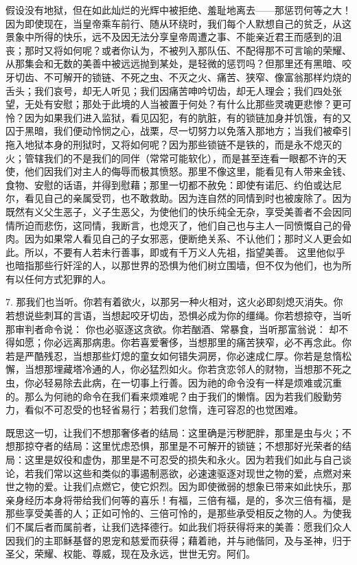 假设没有地狱，但在如此灿烂的光辉中被拒绝、羞耻地离去——那惩罚何等之大！因为即使现在，当皇帝乘车前行、随从环绕时，我们每个人默想自己的贫乏，从这景象中所得的快乐，远不及因无法分享皇帝周遭之事、不能亲近君王而感到的沮丧；那时又将如何呢？或者你认为，不被列入那队伍、不配得那不可言喻的荣耀、从那集会和无数的美善中被远远抛到某处，是轻微的惩罚吗？但那里还有黑暗、咬牙切齿、不可解开的锁链、不死之虫、不灭之火、痛苦、狭窄、像富翁那样灼烧的舌头；我们哀号，却无人听见；我们因痛苦呻吟切齿，却无人理会；我们四处张望，无处有安慰；那处于此境的人当被置于何处？有什么比那些灵魂更悲惨？更可怜？因为如果我们进入监狱，看见囚犯，有的肮脏，有的锁链加身并饥饿，有的又囚于黑暗，我们便动怜悯之心，战栗，尽一切努力以免落入那地方；当我们被牵引拖入地狱本身的刑狱时，又将如何呢？因为那些锁链不是铁的，而是永不熄灭的火；管辖我们的不是我们的同伴（常常可能软化），而是甚至连看一眼都不许的天使，他们因我们对主人的侮辱而极其愤怒。那里不像这里，能看见有人带来金钱、食物、安慰的话语，并得到慰藉；那里一切都不赦免：即使有诺厄、约伯或达尼尔，看见自己的亲属受罚，也不敢救助。因为连自然的同情到时也被废除了。因为既然有义父生恶子，义子生恶父，为使他们的快乐纯全无杂，享受美善者不会因同情所迫而悲伤，这同情，我断言，也熄灭了，他们自己也与主人一同愤慨自己的骨肉。因为如果常人看见自己的子女邪恶，便断绝关系、不认他们；那时义人更会如此。所以，不要有人若未行善事，即或有千万义人先祖，指望美善。 这里他似乎也暗指那些行奸淫的人，以那世界的恐惧为他们树立围墙，但不仅为他们，也为所有以任何方式犯罪的人。\par

7. 那我们也当听。你若有着欲火，以那另一种火相对，这火必即刻熄灭消失。你若想说些刺耳的言语，当想起咬牙切齿，恐惧必成为你的缰绳。你若想掠夺，当听那审判者命令说：  你也必驱逐这贪欲。你若酗酒、常暴食，当听那富翁说：  却不得如愿；你必远离那病患。你若喜爱奢侈，当想那里的痛苦狭窄，必不再念此。你若是严酷残忍，当想那些灯熄的童女如何错失洞房，你必速成仁厚。你若是怠惰松懈，当想那埋藏塔冷通的人，你必猛烈如火。你若贪恋邻人的财物，当想那不死之虫，你必轻易除去此病，在一切事上行善。因为祂的命令没有一样是烦难或沉重的。那么为何祂的命令在我们看来烦难呢？由于我们的懒惰。因为若我们殷勤劳力，看似不可忍受的也轻省易行；若我们怠惰，连可容忍的也觉困难。\par

既思这一切，让我们不想那奢侈者的结局：这里确是污秽肥胖，那里是虫与火；不想那掠夺者的结局：这里忧虑恐惧，那里是不可解开的锁链；不想那好光荣者的结局：这里是奴役和虚伪，那里是不可忍受的损失和永火。因为若我们如此与自己谈论，若我们常以这些和类似的事遏制恶欲，必速速驱逐对现世之物的爱，点燃对来世之物的爱。让我们点燃它，使它炽烈。因为即使微弱的想象已带来如此快乐，那亲身经历本身将带给我们何等的喜乐！有福，三倍有福，是的，多次三倍有福，是那些享受美善的人；正如可怜的、三倍可怜的，是那些承受相反之物的人。为使我们不属后者而属前者，让我们选择德行。如此我们将获得将来的美善：愿我们众人因我们的主耶稣基督的恩宠和慈爱而获得；藉着祂，并与祂偕同，及与圣神，归于圣父，荣耀、权能、尊威，现在及永远，世世无穷。阿们。\par

